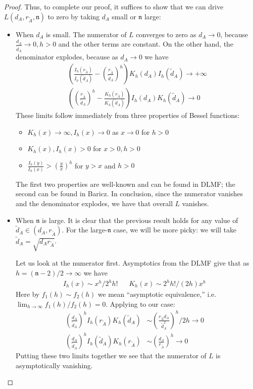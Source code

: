 \documentclass[english, aip, jcp, priprint, graphicx,floatfix]{revtex4-1}
\theoremstyle{plain}
\theoremstyle{definition}
\theoremstyle{plain}
\newcommand{\dimension}{{\mathfrak{n}}}
\begin{document}
\begin{proof}
Thus, to complete our proof, it suffices to show that we can drive $L(d_A,r_{\tilde A},\dimension)$ to zero by taking $d_A$ small or $\dimension$ large:
\begin{itemize}
    \item When $d_A$ is small.  The numerator of $L$ converges to zero as $d_A\rightarrow 0$, because $\frac{d_A}{\tilde{d}_A}\rightarrow 0,h>0$ and the other terms are constant.  On the other hand, the denominator explodes, because as $d_A\rightarrow0$ we have
    \begin{align*}
    & \left( \frac{I_h ( r_{\tilde{A}})}{I_h ( \tilde{d}_A)} - \left(\frac{r_{\tilde{A}}}{\tilde{d}_A} \right)^h  \right)
                K_h ( d_A) I_h ( \tilde{d}_A) \rightarrow +\infty \\
    & \left( \left( \frac{r_{\tilde{A}}}{\tilde{d}_A}\right)^h  - \frac{K_h ( r_{\tilde{A}})}{K_h ( \tilde{d}_A)} \right) 
                I_h (d_A)K_h ( \tilde{d}_A)\rightarrow 0
    \end{align*}
    These limits follow immediately from three properties of Bessel functions:
    \begin{itemize}
        \item $K_h(x)\rightarrow \infty,I_h(x)\rightarrow 0$ as $x\rightarrow 0$ for $h>0$
        \item $K_h(x),I_h(x)>0$ for $x>0,h>0$
        \item $\frac{I_{h}(y)}{I_{h}(x)} > \left(\frac{y}{x}\right)^{h}$ for $y>x$ and $h>0$
    \end{itemize} 
    The first two properties are well-known and can be found in DLMF; the second can be found in Baricz.\cite{noauthor_undated-ti,baricz2010bounds}  In conclusion, since the numerator vanishes and the denominator explodes, we have that overall $L$ vanishes.  
    \item When $\dimension$ is large.  It is clear that the previous result holds for any value of $\tilde d_A\in (d_A, r_{\tilde A})$.  For the large-$\dimension$ case, we will be more picky: we will take $\tilde d_A=\sqrt{d_A r_{\tilde A}}$.  

    Let us look at the numerator first.  Asymptotics from the DLMF give that as $h=(\dimension-2)/2 \rightarrow \infty$ we have
    \begin{align*}
    I_h(x) \sim x^h/2^hh! & & K_h(x) \sim 2^hh!/(2h)x^h  
    \end{align*}
    Here by $f_1(h)\sim f_2(h)$ we mean ``asymptotic equivalence,'' i.e.\ $\lim_{h\rightarrow\infty}f_1(h)/f_2(h)=0$.    Applying to our case:
    \begin{align*}
        \left(\frac{d_A}{\tilde{d}_A}\right)^h I_h (r_{\tilde{A}}) K_h ( \tilde{d}_A) &
                \sim \left(\frac{r_{\tilde{A}} d_A}{\tilde{d}_A^2}\right)^h/2h \rightarrow 0 \\
        \left(\frac{d_A}{\tilde{d}_A}\right)^h I_h ( \tilde{d}_A) K_h (r_{\tilde{A}}) &
                \sim \left(\frac{ d_A}{r_{\tilde A}}\right)^h \rightarrow 0
    \end{align*}
    Putting these two limits together we see that the numerator of $L$ is asymptotically vanishing.


\end{itemize}
\end{proof}
\end{document}
